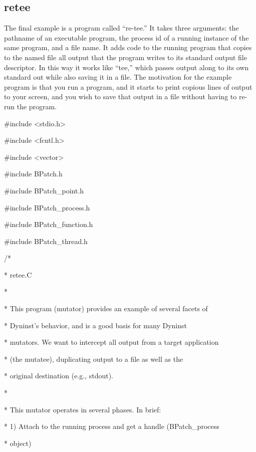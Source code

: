 \subsection{retee}
{
The final example is a program called “re-tee.” It takes three arguments: the pathname of an executable program, the
process id of a running instance of the same program, and a file name. It adds code to the running program that
copies to the named file all output that the program writes to its standard output file descriptor. In this way it
works like “tee,” which passes output along to its own standard out while also saving it in a file. The motivation
for the example program is that you run a program, and it starts to print copious lines of output to your screen, and
you wish to save that output in a file without having to re-run the program.


\bigskip

{
\#include <stdio.h>

{
\#include <fcntl.h>

{
\#include <vector>

{
\#include {\textquotedbl}BPatch.h{\textquotedbl}

{
\#include {\textquotedbl}BPatch_point.h{\textquotedbl}}

{
\#include {\textquotedbl}BPatch_process.h{\textquotedbl}}

{
\#include {\textquotedbl}BPatch_function.h{\textquotedbl}}

{
\#include {\textquotedbl}BPatch_thread.h{\textquotedbl}


\bigskip

{
/*

{
* retee.C}

{
*}

{
* This program (mutator) provides an example of several facets of}

{
* Dyninst's behavior, and is a good basis for many Dyninst}

{
* mutators. We want to intercept all output from a target application}

{
* (the mutatee), duplicating output to a file as well as the}

{
* original destination (e.g., stdout).}

{
*}

{
* This mutator operates in several phases. In brief:}

{
* 1) Attach to the running process and get a handle (BPatch_process}

{
* object)}

}}}}}}}
